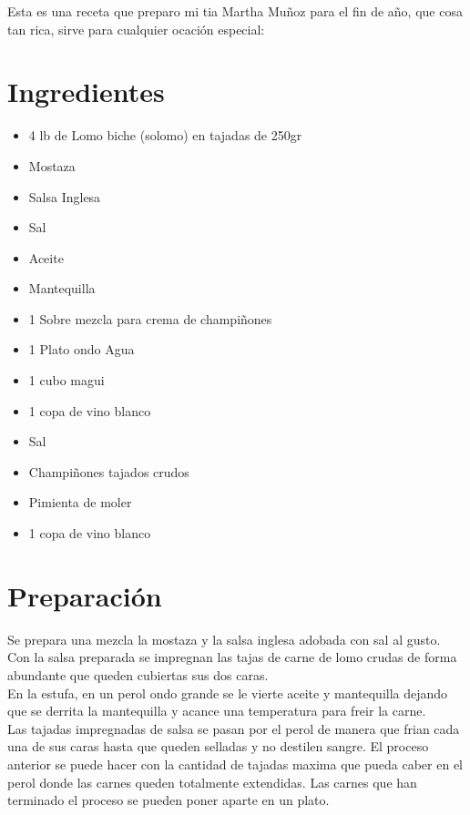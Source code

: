 Esta es una receta que preparo mi tia Martha Muñoz para el fin de año, que cosa tan rica, sirve para cualquier ocación especial:
\section*{Ingredientes}
\begin{itemize}
\setlength{\itemsep}{0pt}
\setlength{\parsep}{0pt} \setlength{\parskip}{0pt}
\item 4 lb de Lomo biche (solomo) en tajadas de 250gr
\item Mostaza
\item Salsa Inglesa
\item Sal
\item Aceite
\item Mantequilla
\item 1 Sobre mezcla para crema de champiñones
\item 1 Plato ondo Agua
\item 1 cubo magui
\item 1 copa de vino blanco
\item Sal
\item Champiñones tajados crudos
\item Pimienta de moler
\item 1 copa de vino blanco
\end{itemize}
\section*{Preparación}
Se prepara una mezcla la mostaza y la salsa inglesa adobada con sal al gusto.\\

Con la salsa preparada se impregnan las tajas de carne de lomo crudas de forma abundante que queden cubiertas sus dos caras.\\

En la estufa, en un perol ondo grande se le vierte aceite y mantequilla dejando que se derrita la mantequilla y acance una temperatura para freir la carne.\\

Las tajadas impregnadas de salsa se pasan por el perol de manera que frian cada una de sus caras hasta que queden selladas y no destilen sangre. El proceso anterior se puede hacer con la cantidad de tajadas maxima que pueda caber en el perol donde las carnes queden totalmente extendidas. Las carnes que han terminado el proceso se pueden poner aparte en un plato.\\

